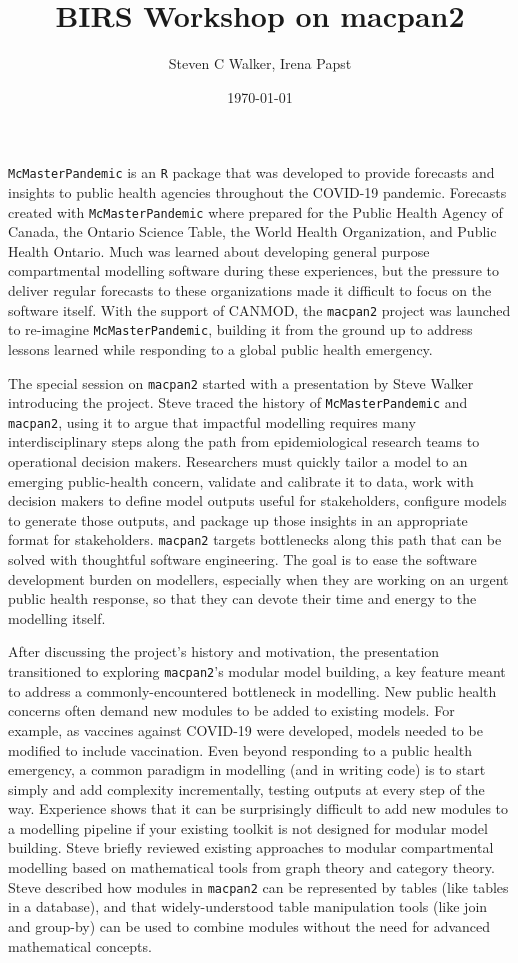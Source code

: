 \documentclass{article}
\title{BIRS Workshop on macpan2}
\date{\today}
\author{Steven C Walker, Irena Papst}
\newcommand{\macpan}{\texttt{macpan2}\xspace}
\newcommand{\macpanOrig}{\texttt{McMasterPandemic}\xspace}
\newcommand{\R}{\texttt{R}\xspace}
\begin{document}
  \maketitle

  \macpanOrig is an \R package that was developed to provide forecasts and insights to public health agencies throughout the COVID-19 pandemic. Forecasts created with \macpanOrig where prepared for the Public Health Agency of Canada, the Ontario Science Table, the World Health Organization, and Public Health Ontario. Much was learned about developing general purpose compartmental modelling software during these experiences, but the pressure to deliver regular forecasts to these organizations made it difficult to focus on the software itself. With the support of CANMOD, the \macpan project was launched to re-imagine \macpanOrig, building it from the ground up to address lessons learned while responding to a global public health emergency.

  The special session on \macpan started with a presentation by Steve Walker introducing the project. Steve traced the history of \macpanOrig and \macpan, using it to argue that impactful modelling requires many interdisciplinary steps along the path from epidemiological research teams to operational decision makers. Researchers must quickly tailor a model to an emerging public-health concern, validate and calibrate it to data, work with decision makers to define model outputs useful for stakeholders, configure models to generate those outputs, and package up those insights in an appropriate format for stakeholders. \macpan targets bottlenecks along this path that can be solved with thoughtful software engineering. The goal is to ease the software development burden on modellers, especially when they are working on an urgent public health response, so that they can devote their time and energy to the modelling itself.

  After discussing the project's history and motivation, the presentation transitioned to exploring \macpan's modular model building, a key feature meant to address a commonly-encountered bottleneck in modelling. New public health concerns often demand new modules to be added to existing models. For example, as vaccines against COVID-19 were developed, models needed to be modified to include vaccination. Even beyond responding to a public health emergency, a common paradigm in modelling (and in writing code) is to start simply and add complexity incrementally, testing outputs at every step of the way. Experience shows that it can be surprisingly difficult to add new modules to a modelling pipeline if your existing toolkit is not designed for modular model building. Steve briefly reviewed existing approaches to modular compartmental modelling based on mathematical tools from graph theory and category theory. Steve described how modules in \macpan can be represented by tables (like tables in a database), and that widely-understood table manipulation tools (like join and group-by) can be used to combine modules without the need for advanced mathematical concepts.
\end{document}
